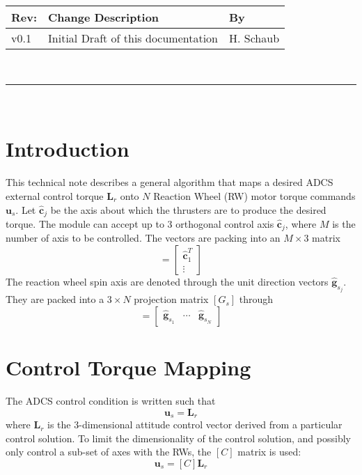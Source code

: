 \documentclass[]{BasiliskReportMemo}
\begin{document}
\makeCover


%
%
\pagestyle{empty}
{\renewcommand{\arraystretch}{1.1}
\noindent
\begin{longtable}{|p{0.5in}|p{4.5in}|p{1.14in}|}
\hline
{\bfseries Rev}: & {\bfseries Change Description} & {\bfseries By} \\
\hline
v0.1 & Initial Draft of this documentation & H. Schaub \\
\hline

\end{longtable}
}

\newpage
\setcounter{page}{1}
\pagestyle{fancy}

\tableofcontents
~\\ \hrule ~\\


\section{Introduction}
This technical note describes a general algorithm that maps a desired ADCS external control torque $\bm L_{r}$ onto $N$ Reaction Wheel (RW) motor torque commands $\bm u_{s}$.  Let $\hat{\bm c}_{j}$ be the axis about which the thrusters are to produce the desired torque.  The module can accept up to 3 orthogonal control axis $\hat{\bm c}_{j}$, where $M$ is the number of axis to be controlled.  The vectors are packing into an $M\times 3$ matrix
\begin{equation}
	[C] = \begin{bmatrix}
		\hat{\bm c}_{1}^{T}\\
		\vdots
	\end{bmatrix}
\end{equation}
The reaction wheel spin axis are denoted through the unit direction vectors $\hat{\bm g}_{s_{j}}$.  They are packed into a $3\times N$ projection matrix $[G_{s}]$ through
\begin{equation}
	[G_{s}] = \begin{bmatrix}
		\hat{\bm g}_{s_{1}} & \cdots & \hat{\bm g}_{s_{N}}
	\end{bmatrix}
\end{equation}



\section{Control Torque Mapping}
The ADCS control condition is written such that
\begin{equation}
	[G_{s}] \bm u_{s} = \bm L_{r}
\end{equation}
where $\bm L_{r}$ is the 3-dimensional attitude control vector derived from a particular control solution.  To limit the dimensionality of the control solution, and possibly only control a sub-set of axes with the RWs, the $[C]$ matrix is used:
\begin{equation}
	[C][G_{s}] \bm u_{s} = [C]\bm L_{r}
	\label{eq:rwM:2}
\end{equation}
\end{document}
